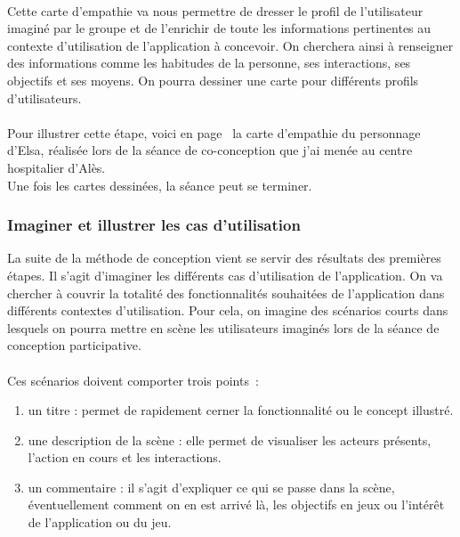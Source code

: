 \paragraph{} Cette carte d'empathie va nous permettre de dresser le profil de l'utilisateur imaginé par le groupe et de l'enrichir de toute les informations pertinentes au contexte d'utilisation de l'application à concevoir. On cherchera ainsi à renseigner des informations comme les habitudes de la personne, ses interactions, ses objectifs et ses moyens. On pourra dessiner une carte pour différents profils d'utilisateurs.

\paragraph{} Pour illustrer cette étape, voici en page~\pageref{empathie_elsa} la carte d'empathie du personnage d'Elsa, réalisée lors de la séance de co-conception que j'ai menée au centre hospitalier d'Alès. \\
Une fois les cartes dessinées, la séance peut se terminer.


\label{empathie_elsa}
	
	\subsubsection*{Imaginer et illustrer les cas d'utilisation}
La suite de la méthode de conception vient se servir des résultats des premières étapes. Il s'agit d'imaginer les différents cas d'utilisation de l'application. On va chercher à couvrir la totalité des fonctionnalités souhaitées de l'application dans différents contextes d'utilisation. Pour cela, on imagine des scénarios courts dans lesquels on pourra mettre en scène les utilisateurs imaginés lors de la séance de conception participative.

\paragraph{}Ces scénarios doivent comporter trois points~:
\begin{enumerate}
	\item un titre : permet de rapidement cerner la fonctionnalité ou le concept illustré.
	\item une description de la scène : elle permet de visualiser les acteurs présents, l'action en cours et les interactions.
	\item un commentaire : il s'agit d'expliquer ce qui se passe dans la scène, éventuellement comment on en est arrivé là, les objectifs en jeux ou l'intérêt de l'application ou du jeu.
\end{enumerate}

